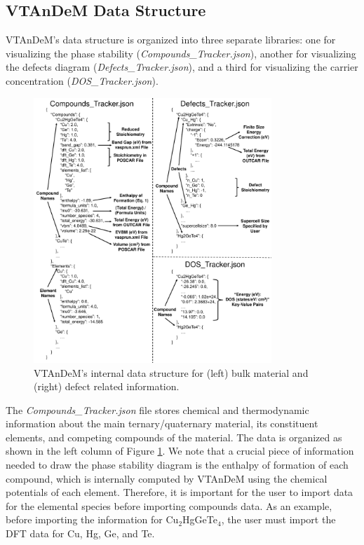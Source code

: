 \documentclass[%
 reprint,
 amsmath,amssymb,
 aps,
]{revtex4-1}
\begin{document}
\subsection{VTAnDeM Data Structure} \label{Subsection:Data_Structure}

VTAnDeM's data structure is organized into three separate libraries: one for visualizing the phase stability (\textit{Compounds\_Tracker.json}), another for visualizing the defects diagram (\textit{Defects\_Tracker.json}), and a third for visualizing the carrier concentration (\textit{DOS\_Tracker.json}).

\begin{figure}
    \centering
    \includegraphics[width=0.8\textwidth]{DataStructure.pdf}
    \caption{VTAnDeM's internal data structure for (left) bulk material and (right) defect related information.}
    \label{Figure:VTAnDeM_DataStructure}
\end{figure}

The \textit{Compounds\_Tracker.json} file stores chemical and thermodynamic information about the main ternary/quaternary material, its constituent elements, and competing compounds of the material. The data is organized as shown in the left column of Figure \ref{Figure:VTAnDeM_DataStructure}. We note that a crucial piece of information needed to draw the phase stability diagram is the enthalpy of formation of each compound, which is internally computed by VTAnDeM using the chemical potentials of each element. Therefore, it is important for the user to import data for the elemental species before importing compounds data. As an example, before importing the information for Cu$_2$HgGeTe$_4$, the user must import the DFT data for Cu, Hg, Ge, and Te.
\end{document}
